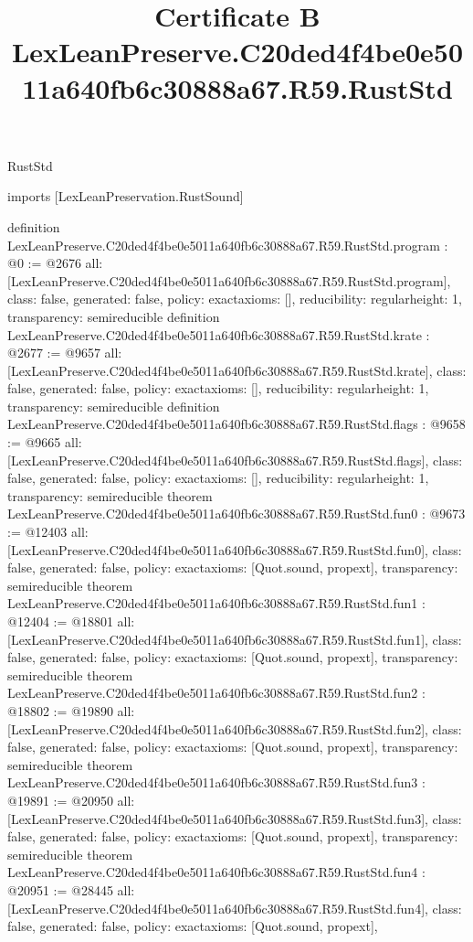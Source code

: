 \begin{lexlean}{RustStd}
\title{Certificate B LexLeanPreserve.C20ded4f4be0e5011a640fb6c30888a67.R59.RustStd}
\begin{coremodule}
imports [LexLeanPreservation.RustSound]

definition LexLeanPreserve.C20ded4f4be0e5011a640fb6c30888a67.R59.RustStd.program : @0 := @2676 {
  all: [LexLeanPreserve.C20ded4f4be0e5011a640fb6c30888a67.R59.RustStd.program],
  class: false,
  generated: false,
  policy: exact{axioms: []},
  reducibility: regular{height: 1},
  transparency: semireducible
}
definition LexLeanPreserve.C20ded4f4be0e5011a640fb6c30888a67.R59.RustStd.krate : @2677 := @9657 {
  all: [LexLeanPreserve.C20ded4f4be0e5011a640fb6c30888a67.R59.RustStd.krate],
  class: false,
  generated: false,
  policy: exact{axioms: []},
  reducibility: regular{height: 1},
  transparency: semireducible
}
definition LexLeanPreserve.C20ded4f4be0e5011a640fb6c30888a67.R59.RustStd.flags : @9658 := @9665 {
  all: [LexLeanPreserve.C20ded4f4be0e5011a640fb6c30888a67.R59.RustStd.flags],
  class: false,
  generated: false,
  policy: exact{axioms: []},
  reducibility: regular{height: 1},
  transparency: semireducible
}
theorem LexLeanPreserve.C20ded4f4be0e5011a640fb6c30888a67.R59.RustStd.fun0 : @9673 := @12403 {
  all: [LexLeanPreserve.C20ded4f4be0e5011a640fb6c30888a67.R59.RustStd.fun0],
  class: false,
  generated: false,
  policy: exact{axioms: [Quot.sound, propext]},
  transparency: semireducible
}
theorem LexLeanPreserve.C20ded4f4be0e5011a640fb6c30888a67.R59.RustStd.fun1 : @12404 := @18801 {
  all: [LexLeanPreserve.C20ded4f4be0e5011a640fb6c30888a67.R59.RustStd.fun1],
  class: false,
  generated: false,
  policy: exact{axioms: [Quot.sound, propext]},
  transparency: semireducible
}
theorem LexLeanPreserve.C20ded4f4be0e5011a640fb6c30888a67.R59.RustStd.fun2 : @18802 := @19890 {
  all: [LexLeanPreserve.C20ded4f4be0e5011a640fb6c30888a67.R59.RustStd.fun2],
  class: false,
  generated: false,
  policy: exact{axioms: [Quot.sound, propext]},
  transparency: semireducible
}
theorem LexLeanPreserve.C20ded4f4be0e5011a640fb6c30888a67.R59.RustStd.fun3 : @19891 := @20950 {
  all: [LexLeanPreserve.C20ded4f4be0e5011a640fb6c30888a67.R59.RustStd.fun3],
  class: false,
  generated: false,
  policy: exact{axioms: [Quot.sound, propext]},
  transparency: semireducible
}
theorem LexLeanPreserve.C20ded4f4be0e5011a640fb6c30888a67.R59.RustStd.fun4 : @20951 := @28445 {
  all: [LexLeanPreserve.C20ded4f4be0e5011a640fb6c30888a67.R59.RustStd.fun4],
  class: false,
  generated: false,
  policy: exact{axioms: [Quot.sound, propext]},
}
\end{coremodule}
\end{lexlean}
